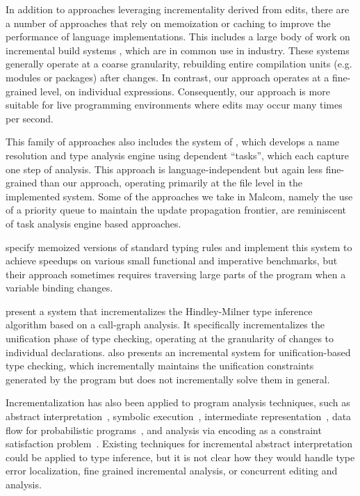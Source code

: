 In addition to approaches leveraging incrementality derived from edits, there are a number of approaches that rely on memoization or caching to improve the performance of language implementations. This includes a large body of work on incremental build systems \cite{ALACARTE, SALSA}, which are in common use in industry. These systems generally operate at a coarse granularity, rebuilding entire compilation units (e.g. modules or packages) after changes. In contrast, our approach operates at a fine-grained level, on individual expressions. Consequently, our approach is more suitable for live programming environments where edits may occur many times per second.

This family of approaches also includes the system of \citet{DBLP:conf/sle/WachsmuthKVGV13}, which develops a name resolution and type analysis engine using dependent ``tasks'', which each capture one step of analysis. This approach is language-independent but again less fine-grained than our approach, operating primarily at the file level in the implemented system. Some of the approaches we take in Malcom, namely the use of a priority queue to maintain the update propagation frontier, are reminiscent of task analysis engine based approaches.

\citet{DBLP:conf/nfm/BusiDG19} specify memoized versions of standard typing rules and implement this system to achieve speedups on various small functional and imperative benchmarks, but their approach sometimes requires traversing large parts of the program when a variable binding changes.  

\citet{DBLP:conf/fpca/AdityaN91} present a system that incrementalizes the Hindley-Milner type inference algorithm based on a call-graph analysis. It specifically incrementalizes the unification phase of type checking, operating at the granularity of changes to individual declarations. \citet{DBLP:conf/popl/Meertens83} also presents an incremental system for unification-based type checking, which incrementally maintains the unification constraints generated by the program but does not incrementally solve them in general.  

Incrementalization has also been applied to program analysis techniques, such as abstract interpretation~\cite{DBLP:conf/sigsoft/McPeakGR13,DBLP:conf/birthday/SeidlEV15,DBLP:conf/benevol/EsVR17,DBLP:conf/ecoop/Razafintsialonina25}, symbolic execution~\cite{DBLP:conf/icse/YangKP04,DBLP:conf/issta/YangPK12,DBLP:journals/tosem/YangPRK14,DBLP:conf/icse/QiuYPK15}, intermediate representation~\cite{DBLP:conf/indiaSE/GhimeKJC22}, data flow for probabilistic programs~\cite{DBLP:conf/sas/ZhangSX17}, and analysis via encoding as a constraint satisfaction problem~\cite{DBLP:conf/fase/MudduluruR14}. Existing techniques for incremental abstract interpretation could be applied to type inference, but it is not clear how they would handle type error localization, fine grained incremental analysis, or concurrent editing and analysis. 

